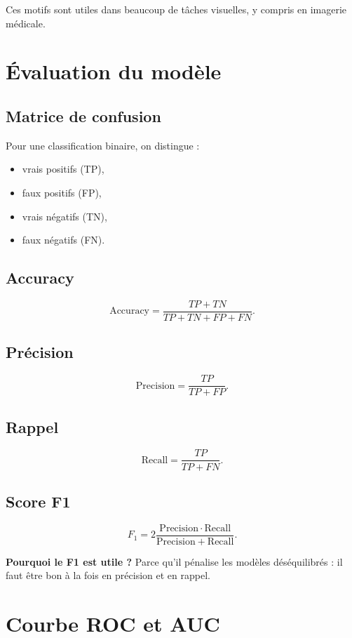 ﻿\documentclass[11pt,a4paper]{article}
\begin{document}
Ces motifs sont utiles dans beaucoup de tâches visuelles, y compris en imagerie médicale.

\section{Évaluation du modèle}

\subsection{Matrice de confusion}

Pour une classification binaire, on distingue :
\begin{itemize}
    \item vrais positifs (TP),
    \item faux positifs (FP),
    \item vrais négatifs (TN),
    \item faux négatifs (FN).
\end{itemize}

\subsection{Accuracy}

\[
\mathrm{Accuracy}
=
\frac{TP+TN}{TP+TN+FP+FN}.
\]

\subsection{Précision}

\[
\mathrm{Precision}
=
\frac{TP}{TP+FP}.
\]

\subsection{Rappel}

\[
\mathrm{Recall}
=
\frac{TP}{TP+FN}.
\]

\subsection{Score F1}

\[
F_1 = 2\frac{\mathrm{Precision}\cdot \mathrm{Recall}}
{\mathrm{Precision}+\mathrm{Recall}}.
\]

\textbf{Pourquoi le F1 est utile ?}  
Parce qu’il pénalise les modèles déséquilibrés : il faut être bon à la fois en précision et en rappel.

\section{Courbe ROC et AUC}
\end{document}
